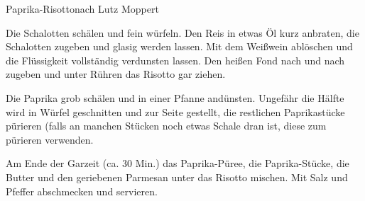 \begin{recipe}{Paprika-Risotto}{nach Lutz Moppert}
  \label{Paprika-Risotto}
  \inglist

  \steps
  Die Schalotten schälen und fein würfeln. Den Reis in etwas Öl kurz anbraten, die
  Schalotten zugeben und glasig werden lassen. Mit dem Weißwein ablöschen und die
  Flüssigkeit vollständig verdunsten lassen. Den heißen Fond nach und nach zugeben und
  unter Rühren das Risotto gar ziehen.

  Die Paprika grob schälen und in einer Pfanne andünsten. Ungefähr die Hälfte wird in
  Würfel geschnitten und zur Seite gestellt, die restlichen Paprikastücke pürieren (falls
  an manchen Stücken noch etwas Schale dran ist, diese zum pürieren verwenden.

  Am Ende der Garzeit (ca. 30 Min.) das Paprika-Püree, die Paprika-Stücke, die Butter und
  den geriebenen Parmesan unter das Risotto mischen. Mit Salz und Pfeffer abschmecken und
  servieren.

\end{recipe}
